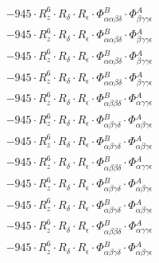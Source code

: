 \documentclass{article}
\begin{document}
\begin{subequations}
\begin{gather}
\begin{array}{c}
 \\[0.2em] 		 - 945 \cdot R_{z}^{6} \cdot R_{\delta{}} \cdot R_{\epsilon{}} \cdot \Phi{}^{B}_{\alpha{}\alpha{}\beta{}\delta{}} \cdot \Phi{}^{A}_{\beta{}\gamma{}\gamma{}\epsilon{}} 
 \\[0.2em] 		 - 945 \cdot R_{z}^{6} \cdot R_{\delta{}} \cdot R_{\epsilon{}} \cdot \Phi{}^{B}_{\alpha{}\alpha{}\beta{}\delta{}} \cdot \Phi{}^{A}_{\beta{}\gamma{}\gamma{}\epsilon{}} 
 \\[0.2em] 		 - 945 \cdot R_{z}^{6} \cdot R_{\delta{}} \cdot R_{\epsilon{}} \cdot \Phi{}^{B}_{\alpha{}\alpha{}\beta{}\delta{}} \cdot \Phi{}^{A}_{\beta{}\gamma{}\gamma{}\epsilon{}} 
 \\[0.2em] 		 - 945 \cdot R_{z}^{6} \cdot R_{\delta{}} \cdot R_{\epsilon{}} \cdot \Phi{}^{B}_{\alpha{}\alpha{}\beta{}\delta{}} \cdot \Phi{}^{A}_{\beta{}\gamma{}\gamma{}\epsilon{}} 
 \\[0.2em] 		 - 945 \cdot R_{z}^{6} \cdot R_{\delta{}} \cdot R_{\epsilon{}} \cdot \Phi{}^{B}_{\alpha{}\beta{}\beta{}\delta{}} \cdot \Phi{}^{A}_{\alpha{}\gamma{}\gamma{}\epsilon{}} 
 \\[0.2em] 		 - 945 \cdot R_{z}^{6} \cdot R_{\delta{}} \cdot R_{\epsilon{}} \cdot \Phi{}^{B}_{\alpha{}\beta{}\gamma{}\delta{}} \cdot \Phi{}^{A}_{\alpha{}\beta{}\gamma{}\epsilon{}} 
 \\[0.2em] 		 - 945 \cdot R_{z}^{6} \cdot R_{\delta{}} \cdot R_{\epsilon{}} \cdot \Phi{}^{B}_{\alpha{}\beta{}\gamma{}\delta{}} \cdot \Phi{}^{A}_{\alpha{}\beta{}\gamma{}\epsilon{}} 
 \\[0.2em] 		 - 945 \cdot R_{z}^{6} \cdot R_{\delta{}} \cdot R_{\epsilon{}} \cdot \Phi{}^{B}_{\alpha{}\beta{}\beta{}\delta{}} \cdot \Phi{}^{A}_{\alpha{}\gamma{}\gamma{}\epsilon{}} 
 \\[0.2em] 		 - 945 \cdot R_{z}^{6} \cdot R_{\delta{}} \cdot R_{\epsilon{}} \cdot \Phi{}^{B}_{\alpha{}\beta{}\gamma{}\delta{}} \cdot \Phi{}^{A}_{\alpha{}\beta{}\gamma{}\epsilon{}} 
 \\[0.2em] 		 - 945 \cdot R_{z}^{6} \cdot R_{\delta{}} \cdot R_{\epsilon{}} \cdot \Phi{}^{B}_{\alpha{}\beta{}\gamma{}\delta{}} \cdot \Phi{}^{A}_{\alpha{}\beta{}\gamma{}\epsilon{}} 
 \\[0.2em] 		 - 945 \cdot R_{z}^{6} \cdot R_{\delta{}} \cdot R_{\epsilon{}} \cdot \Phi{}^{B}_{\alpha{}\beta{}\beta{}\delta{}} \cdot \Phi{}^{A}_{\alpha{}\gamma{}\gamma{}\epsilon{}} 
 \\[0.2em] 		 - 945 \cdot R_{z}^{6} \cdot R_{\delta{}} \cdot R_{\epsilon{}} \cdot \Phi{}^{B}_{\alpha{}\beta{}\gamma{}\delta{}} \cdot \Phi{}^{A}_{\alpha{}\beta{}\gamma{}\epsilon{}} 

\end{array}
\end{gather}
\end{subequations}
\end{document}
